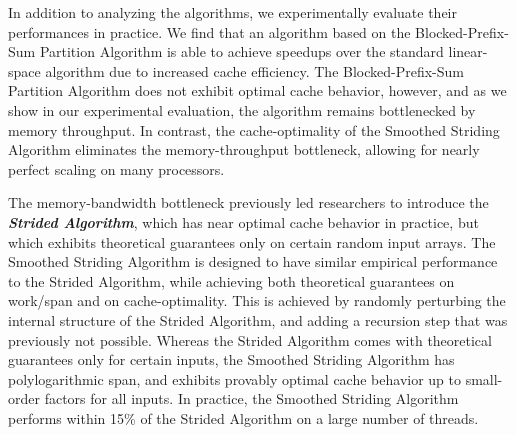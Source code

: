 \documentclass[twoside,leqno,twocolumn]{article}
\newcommand{\defn}[1]{{\textit{\textbf{\boldmath #1}}}}
\begin{document}
In addition to analyzing the algorithms, we experimentally evaluate
their performances in practice. We find that an algorithm based on the
Blocked-Prefix-Sum Partition Algorithm is able to achieve speedups over
the standard linear-space algorithm due to increased cache
efficiency. The Blocked-Prefix-Sum Partition Algorithm does not exhibit
optimal cache behavior, however, and as we show in our experimental
evaluation, the algorithm remains bottlenecked by memory
throughput. In contrast, the cache-optimality of the Smoothed Striding
Algorithm eliminates the memory-throughput bottleneck, allowing for
nearly perfect scaling on many processors.

The memory-bandwidth bottleneck previously led researchers
\cite{FrancisPa92, Frias08} to introduce the \defn{Strided
  Algorithm}, which has near optimal cache behavior in practice, but
which exhibits theoretical guarantees only on certain random input
arrays. The Smoothed Striding Algorithm is designed to have similar
empirical performance to the Strided Algorithm, while achieving both
theoretical guarantees on work/span and on cache-optimality. This is
achieved by randomly perturbing the internal structure of the Strided
Algorithm, and adding a recursion step that was previously not
possible. Whereas the Strided Algorithm comes with theoretical
guarantees only for certain inputs, the Smoothed Striding Algorithm 
has polylogarithmic span, and exhibits provably optimal cache behavior
up to small-order factors for all inputs. In practice, the Smoothed Striding
Algorithm performs within 15\% of the Strided Algorithm on a large
number of threads.





\end{document}
